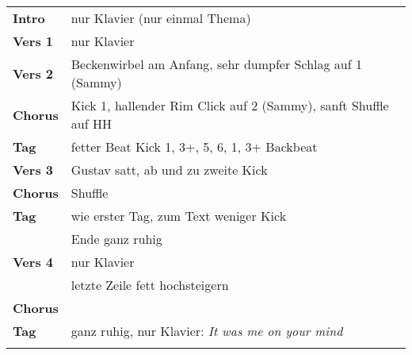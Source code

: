 
\begin{tabular}{p{1.6cm}l}
	\textbf{Intro}  & nur Klavier (nur einmal Thema)                                  \\
	\textbf{Vers 1} & nur Klavier                                                     \\
	\textbf{Vers 2} & Beckenwirbel am Anfang, sehr dumpfer Schlag auf 1 (Sammy)       \\
	\textbf{Chorus} & Kick 1, hallender Rim Click auf 2 (Sammy), sanft Shuffle auf HH \\
	\textbf{Tag}    & fetter Beat Kick 1, 3+, 5, 6, 1, 3+ Backbeat                    \\
	\textbf{Vers 3} & Gustav satt, ab und zu zweite Kick                              \\
	\textbf{Chorus} & Shuffle                                                         \\
	\textbf{Tag}    & wie erster Tag, zum Text weniger Kick                           \\
	                & Ende ganz ruhig                                                 \\
	\textbf{Vers 4} & nur Klavier                                                     \\
	                & letzte Zeile fett hochsteigern                                  \\
	\textbf{Chorus} &                                                                 \\
	\textbf{Tag}    & ganz ruhig, nur Klavier: \textit{It was me on your mind}        \\
	                &                                                                 \\
\end{tabular}
